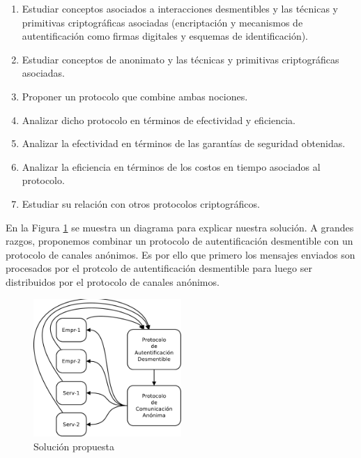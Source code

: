 \begin{enumerate}
    \item Estudiar conceptos asociados a interacciones desmentibles y las técnicas y
          primitivas criptográficas asociadas (encriptación y mecanismos de autentificación
           como firmas digitales y esquemas de identificación).
    \item Estudiar conceptos de anonimato y las técnicas y primitivas criptográficas
          asociadas.
    \item Proponer un protocolo que combine ambas nociones.
    \item Analizar dicho protocolo en términos de efectividad y eficiencia.
    \item Analizar la efectividad en términos de las garantías de seguridad obtenidas.
    \item Analizar la eficiencia en términos de los costos en tiempo asociados al
          protocolo.
    \item Estudiar su relación con otros protocolos criptográficos.
\end{enumerate}


En la Figura \ref{sigmix_simple} se muestra un diagrama para explicar nuestra solución. A grandes
razgos, proponemos combinar un protocolo de autentificación desmentible con un protocolo de
canales anónimos. Es por ello que primero los mensajes enviados son procesados por el protcolo de
autentificación desmentible para luego ser distribuidos por el protocolo de canales anónimos.

\begin{figure}[hp]
    \centering
    \includegraphics[width=0.5\textwidth]{figs/sigmix_simple}
    \caption{Solución propuesta}
    \label{sigmix_simple}
\end{figure}

